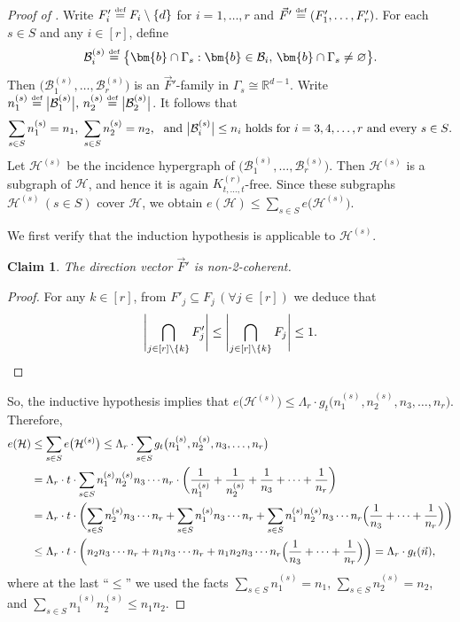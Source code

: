 \documentclass[11pt]{article}
\newtheorem{claim}[theorem]{Claim}
\theoremstyle{definition}
\newcommand*{\eqdef}{\stackrel{\mbox{\normalfont\tiny def}}{=}} %
\newcommand*{\R}{\mathbb{R}}                                    %
\newcommand*{\cH}{\mathcal{H}}
\newcommand*{\vF}{\vec{F}}
\newcommand*{\cB}{\mathcal{B}}
\newcommand*{\vn}{\vec{n}}
\begin{document}
\begin{proof}[Proof of ]
    Write $F'_i \eqdef F_i \setminus \{d\}$ for $i = 1, \dots, r$ and $\vF' \eqdef (F'_1, \dots, F'_r)$. For each $s \in S$ and any $i \in [r]$, define
    \[
    \cB^{(s)}_i \eqdef \bigl\{ \bm{b} \cap \Gamma_s : \bm{b} \in \cB_i, \, \bm{b} \cap \Gamma_s \ne \varnothing \bigr\}. 
    \]
    Then $\bigl( \cB^{(s)}_1, \dots, \cB^{(s)}_r \bigr)$ is an $\vF'$-family in $\Gamma_s \cong \R^{d-1}$. Write $n_1^{(s)} \eqdef \bigl| \cB_1^{(s)} \bigr|, \, n_2^{(s)} \eqdef \bigl| \cB_2^{(s)} \bigr|$. It follows that
    \[
    \text{$\sum_{s \in S} n_1^{(s)} = n_1, \ \sum_{s \in S} n_2^{(s)} = n_2$, \, and $\bigl| \cB^{(s)}_i \bigr| \le n_i$ holds for $i = 3, 4, \dots, r$ and every $s \in S$}. 
    \]
    Let $\cH^{(s)}$ be the incidence hypergraph of $\bigl( \cB^{(s)}_1, \dots, \cB^{(s)}_r \bigr)$. Then $\cH^{(s)}$ is a subgraph of $\cH$, and hence it is again $K_{t, \dots, t}^{(r)}$-free. Since these subgraphs $\cH^{(s)} \, (s \in S)$ cover $\cH$, we obtain $e(\cH) \le \sum_{s \in S} e \bigl( \cH^{(s)} \bigr)$. 
    
    We first verify that the induction hypothesis is applicable to $\cH^{(s)}$. 
    
    \begin{claim}
        The direction vector $\vF'$ is non-2-coherent.
    \end{claim}

    {\renewcommand{\qedsymbol}{$\blacksquare$}
    \begin{proof}
        For any $k \in [r]$, from $F'_j \subseteq F_j \, (\forall j \in [r])$ we deduce that
        \[
        \Biggl| \bigcap_{j \in [r] \setminus \{k\}} F'_j \Biggr| \le \Biggl| \bigcap_{j \in [r] \setminus \{k\}} F_j \Biggr| \le 1. \qedhere
        \]
    \end{proof}
    }

    So, the inductive hypothesis implies that $e \bigl( \cH^{(s)} \bigr) \le \Lambda_r \cdot g_t \bigl( n_1^{(s)}, n_2^{(s)}, n_3, \dots, n_r \bigr)$. Therefore, 
    \begin{align*}
        e(\cH) &\le \sum_{s \in S} e \bigl( \cH^{(s)} \bigr) \le \Lambda_r \cdot \sum_{s \in S} g_t \bigl( n_1^{(s)}, n_2^{(s)}, n_3, \dots, n_r \bigr) \\
        &= \Lambda_r \cdot t \cdot \sum_{s \in S} n_1^{(s)} n_2^{(s)} n_3 \cdots n_r \cdot \biggl( \frac{1}{n_1^{(s)}} + \frac{1}{n_2^{(s)}} + \frac{1}{n_3} + \dots + \frac{1}{n_r} \biggr) \\
        &= \Lambda_r \cdot t \cdot \biggl( \sum_{s \in S} n_2^{(s)} n_3 \cdots n_r + \sum_{s \in S} n_1^{(s)} n_3 \cdots n_r + \sum_{s \in S} n_1^{(s)} n_2^{(s)} n_3 \cdots n_r \Bigl( \frac{1}{n_3}+\dots+\frac{1}{n_r} \Bigr) \biggr) \\
        &\le \Lambda_r \cdot t \cdot \biggl( n_2 n_3 \cdots n_r + n_1 n_3 \cdots n_r + n_1 n_2 n_3 \cdots n_r \Bigl( \frac{1}{n_3} + \dots + \frac{1}{n_r} \Bigr) \biggr) = \Lambda_r \cdot g_t(\vn), 
    \end{align*}
    where at the last ``$\le$'' we used the facts $\sum_{s \in S} n_1^{(s)} = n_1, \, \sum_{s \in S} n_2^{(s)} = n_2$, and $\sum_{s \in S} n_1^{(s)} n_2^{(s)} \le n_1 n_2$. 


\end{proof}
\end{document}

